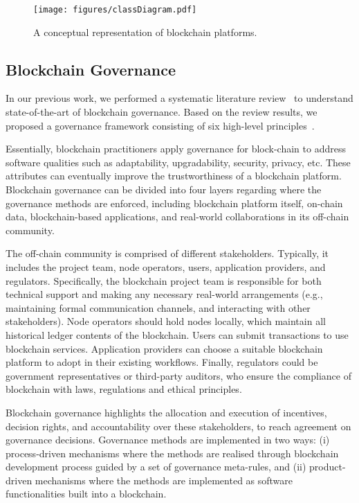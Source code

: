 \documentclass{article}
\begin{document}
\begin{figure}[tpb]
	\centering
	\texttt{[image: figures/classDiagram.pdf]}
	\caption{A conceptual representation of blockchain platforms.}
	\label{fig:component}
\end{figure}

\subsection{Blockchain Governance}
In our previous work, we performed a systematic literature review~\cite{liu2021systematic} to understand state-of-the-art of blockchain governance. Based on the review results, we proposed a governance framework consisting of six high-level principles~\cite{liu2021defining}. 

Essentially, blockchain practitioners apply governance for block-chain to address software qualities such as adaptability, upgradability, security, privacy, etc. These attributes can eventually improve the trustworthiness of a blockchain platform. Blockchain governance can be divided into four layers regarding where the governance methods are enforced, including blockchain platform itself, on-chain data, blockchain-based applications, and real-world collaborations in its off-chain community.

The off-chain community is comprised of different stakeholders. Typically, it includes the project team, node operators, users, application providers, and regulators. Specifically, the blockchain project team is responsible for both technical support and making any necessary real-world arrangements (e.g., maintaining formal communication channels, and interacting with other stakeholders). Node operators should hold nodes locally, which maintain all historical ledger contents of the blockchain. Users can submit transactions to use blockchain services. Application providers can choose a suitable blockchain platform to adopt in their existing workflows. Finally, regulators could be government representatives or third-party auditors, who ensure the compliance of blockchain with laws, regulations and ethical principles.

Blockchain governance highlights the allocation and execution of incentives, decision rights, and accountability over these stakeholders, to reach agreement on governance decisions. Governance methods are implemented in two ways: (i) process-driven mechanisms where the methods are realised through blockchain development process guided by a set of governance meta-rules, and (ii) product-driven mechanisms where the methods are implemented as software functionalities built into a blockchain.
\end{document}
